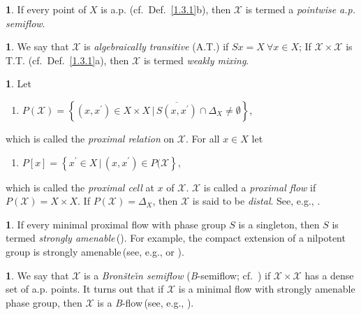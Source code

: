 \documentclass[12pt,final,3p,times]{elsarticle}
\theoremstyle{definition}
\newtheorem{sse}[sthm]{}
\numberwithin{equation}{section}
\begin{document}
\begin{sse}\label{5.1.1}
If every point of $X$ is a.p. (cf.~Def.~\ref{1.3.1}b), then $\mathscr{X}$ is termed a \textit{pointwise a.p. semiflow}. 
\end{sse}

\begin{sse}\label{5.1.2}
We say that $\mathscr{X}$ is \textit{algebraically transitive} (A.T.) if $Sx=X\ \forall x\in X$; If $\mathscr{X}\times\mathscr{X}$ is T.T. (cf.~Def.~\ref{1.3.1}a), then $\mathscr{X}$ is termed \textit{weakly mixing}.
\end{sse}

\begin{sse}\label{5.1.3}
Let    
\begin{enumerate}
    \item[] $P(\mathscr{X})=\left\{(x,x^\prime)\in X\times X\,|\,\overline{S(x,x^\prime)}\cap\Delta_X\not=\emptyset\right\}$,
    \end{enumerate}
    which is called the \textit{proximal relation} on $\mathscr{X}$. For all $x\in X$ let
    \begin{enumerate}
    \item[] $P[x]=\left\{x^\prime\in X\,|\,(x,x^\prime)\in P(\mathscr{X}\right\}$,
    \end{enumerate}
    which is called the \textit{proximal cell} at $x$ of $\mathscr{X}$.
    $\mathscr{X}$ is called a \textit{proximal flow} if $P(\mathscr{X})=X\times X$. If $P(\mathscr{X})=\Delta_X$, then $\mathscr{X}$ is said to be \textit{distal}.  See, e.g., \cite{E69, G76, B79, Wo, A88, DeV, CD}.
\end{sse}

\begin{sse}\label{5.1.4} 
If every minimal proximal flow with phase group $S$ is a singleton, then $S$ is termed \textit{strongly amenable}\,(\cite[$\S$II.3]{G76}). For example, the compact extension of a nilpotent group is strongly amenable\,(see, e.g., \cite[Thm.~II.3.4]{G76} or \cite[Prop.~1.4]{MW74}).
\end{sse}

\begin{sse}\label{5.1.5}
We say that $\mathscr{X}$ is a \textit{Bron\v{s}te\v{\i}n semiflow} (\textsl{B}-semiflow; cf.~\cite{V77}) if $\mathscr{X}\times\mathscr{X}$ has a dense set of a.p. points. It turns out that if $\mathscr{X}$ is a minimal flow with strongly amenable phase group, then $\mathscr{X}$ is a \textsl{B}-flow\,(see, e.g., \cite[Prop.~X.1.3]{G76}).
\end{sse}
\end{document}
